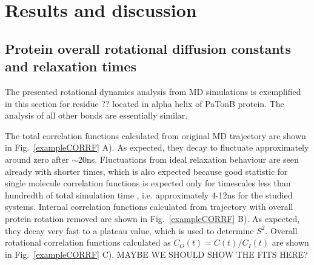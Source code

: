 \documentclass[pre,aps,floatfix,authordate1-4,twocolumn]{revtex4-1}
\begin{document}
\section{Results and discussion}

\subsection{Protein overall rotational diffusion constants and relaxation times}
The presented rotational dynamics analysis from MD simulations is
exemplified in this section for residue ?? located in alpha helix of PaTonB protein.
The analysis of all other bonds are essentially similar.

The total correlation functions calculated from original MD trajectory
are shown in Fig.~\ref{exampleCORRF} A). As expected, they decay
to fluctuate approximately around zero after $\sim$20ns. Fluctuations from
ideal relaxation behaviour are seen already with shorter times, which is also
expected because good statistic for single molecule correlation functions
is expected only for timescales less than hundredth of total simulation time \cite{??},
i.e. approximately 4-12ns for the studied systems. Internal correlation functions
calculated from trajectory with overall protein rotation removed are shown in
Fig.~\ref{exampleCORRF} B). As expected, they decay very fast to a plateau value, which is used
to determine $S^2$. Overall rotational correlation functions calculated as $C_O(t)=C(t)/C_I(t)$
are shown in Fig.~\ref{exampleCORRF} C). MAYBE WE SHOULD SHOW THE FITS HERE?
\end{document}
